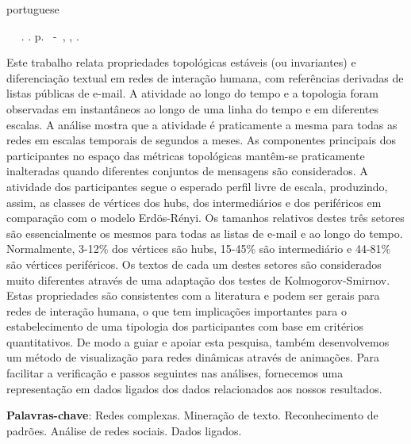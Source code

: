 \documentclass[
12pt,		%
openright,	%
twoside,  %
a4paper,			%
chapter=TITLE,		%
english,			%
french,				%
spanish,			%
brazil				%
]{USPSC}
\begin{document}
\setlength{\absparsep}{18pt} %
\begin{resumo}[Resumo]
 \begin{otherlanguage*}{portuguese}
	\begin{flushleft}\footnotesize 
			\setlength{\absparsep}{0pt} %
			\SingleSpacing 
			\imprimirautorabr~ ~\textbf{\imprimirtitulo}.	\imprimirdata. \pageref{LastPage}p. 
			\imprimirtipotrabalho~-~\imprimirinstituicao, \imprimirlocal, \imprimirdata. 
 	\end{flushleft}
\OnehalfSpacing 			
	 Este trabalho relata propriedades topológicas estáveis (ou invariantes) e diferenciação textual em redes de interação humana,
	 com referências derivadas de listas públicas de e-mail.
	 A atividade ao longo do tempo e a topologia foram observadas em instantâneos ao longo de uma linha do tempo e em
	 diferentes escalas.
	 A análise mostra que a atividade é praticamente a mesma para todas as redes em escalas temporais
	 de segundos a meses.
	 As componentes principais dos participantes no espaço das métricas topológicas
	 mantêm-se praticamente inalteradas quando diferentes conjuntos de mensagens são considerados.
	 A atividade dos participantes
	 segue o esperado perfil livre de escala, produzindo, assim, as classes de vértices dos hubs, dos intermediários e dos periféricos em
	 comparação com o modelo Erdös-Rényi.
	 Os tamanhos relativos destes três setores são essencialmente os mesmos
	 para todas as listas de e-mail e ao longo do tempo.
	 Normalmente, 3-12\% dos vértices são hubs, 15-45\% são intermediário
	 e 44-81\% são vértices periféricos.
	 Os textos de cada um destes setores são considerados muito diferentes através de uma adaptação dos testes de Kolmogorov-Smirnov.
	 Estas propriedades são consistentes com a literatura e podem ser gerais para
	 redes de interação humana, o que tem implicações importantes para o estabelecimento de uma tipologia dos participantes com base em
	 critérios quantitativos.
	 De modo a guiar e apoiar esta pesquisa, também desenvolvemos um método de visualização para redes dinâmicas através de animações.
	 Para facilitar a verificação e passos seguintes nas análises, fornecemos uma representação em dados ligados dos dados relacionados aos nossos resultados.

 \textbf{Palavras-chave}: Redes complexas. Mineração de texto. Reconhecimento de padrões. Análise de redes sociais. Dados ligados.
 \end{otherlanguage*}
\end{resumo}
\end{document}
